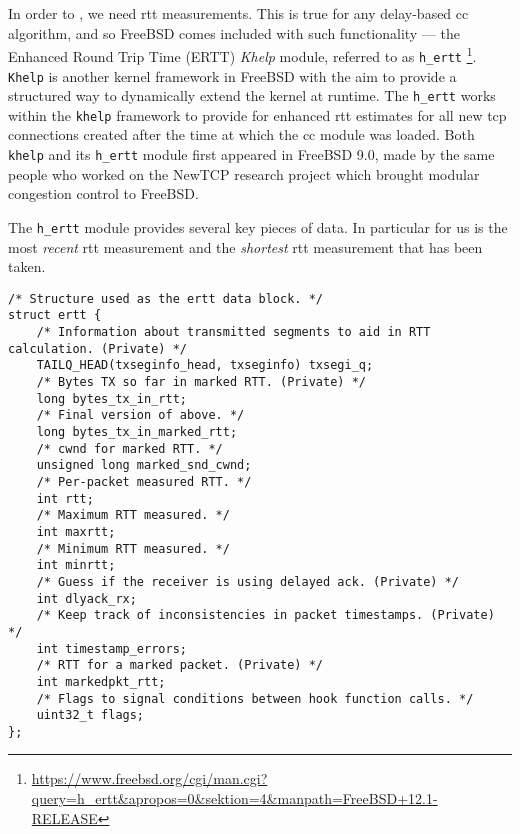 
In order to , we need \gls{rtt} measurements. This is true for any delay-based \gls{cc} algorithm, and so FreeBSD comes included with such functionality --- the Enhanced	Round Trip Time (ERTT) \textit{Khelp} module, referred to as \lstinline{h_ertt} \footnote{\url{https://www.freebsd.org/cgi/man.cgi?query=h_ertt&apropos=0&sektion=4&manpath=FreeBSD+12.1-RELEASE}}. \lstinline{Khelp} is another kernel framework in FreeBSD with the aim to provide a structured way to dynamically extend the kernel at runtime. The \lstinline{h_ertt} works within the \lstinline{khelp} framework to provide for enhanced \gls{rtt} estimates for all new \gls{tcp} connections created after the time at which the \gls{cc} module was loaded. Both \lstinline{khelp} and its \lstinline{h_ertt} module first appeared in FreeBSD 9.0, made by the same people who worked on the NewTCP research project which brought modular congestion control to FreeBSD. 

The \lstinline{h_ertt} module provides several key pieces of data. In particular for us is the most \textit{recent} \gls{rtt} measurement and the \textit{shortest} \gls{rtt} measurement that has been taken.

\begin{code}
\begin{verbatim}
/* Structure used as the ertt data block. */
struct ertt {
    /* Information about transmitted segments to aid in RTT calculation. (Private) */
    TAILQ_HEAD(txseginfo_head, txseginfo) txsegi_q;
    /* Bytes TX so far in marked RTT. (Private) */
    long bytes_tx_in_rtt;
    /* Final version of above. */
    long bytes_tx_in_marked_rtt;
    /* cwnd for marked RTT. */
    unsigned long marked_snd_cwnd;
    /* Per-packet measured RTT. */
    int	rtt;
    /* Maximum RTT measured. */
    int	maxrtt;
    /* Minimum RTT measured. */
    int	minrtt;
    /* Guess if the receiver is using delayed ack. (Private) */
    int	dlyack_rx;
    /* Keep track of inconsistencies in packet timestamps. (Private) */
    int	timestamp_errors;
    /* RTT for a marked packet. (Private) */
    int	markedpkt_rtt;
    /* Flags to signal conditions between hook function calls. */
    uint32_t flags;
};
\end{verbatim}
\label{code:ertt.h}
\end{code}

